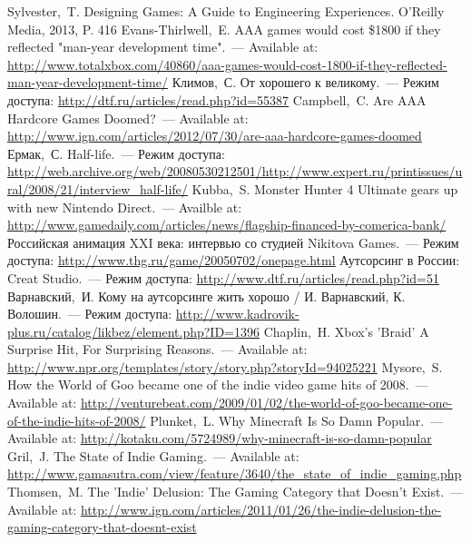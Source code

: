 \renewcommand{\bibname}{Список используемой литературы}
\begin{thebibliography}{10}
     Sylvester,~T. Designing Games: A Guide to Engineering Experiences. O'Reilly Media, 2013, 
        P. 416
     Evans-Thirlwell,~E. AAA games would cost \$1800 if they reflected "man-year development 
        time".~--- Available at: 
        \url{http://www.totalxbox.com/40860/aaa-games-would-cost-1800-if-they-reflected-man-year-development-time/}
     Климов,~С. От хорошего к великому.~--- Режим доступа: 
        \url{http://dtf.ru/articles/read.php?id=55387}
     Campbell,~C. Are AAA Hardcore Games Doomed?~--- Available at: 
        \url{http://www.ign.com/articles/2012/07/30/are-aaa-hardcore-games-doomed}
     Ермак,~С. Half-life.~--- Режим доступа: 
        \url{http://web.archive.org/web/20080530212501/http://www.expert.ru/printissues/ural/2008/21/interview_half-life/}
     Kubba,~S. Monster Hunter 4 Ultimate gears up with new Nintendo Direct.~--- Availble at: 
        \url{http://www.gamedaily.com/articles/news/flagship-financed-by-comerica-bank/}
     Российская анимация XXI века: интервью со студией Nikitova Games.~--- Режим доступа: 
        \url{http://www.thg.ru/game/20050702/onepage.html}
     Аутсорсинг в России: Creat Studio.~--- Режим доступа: 
        \url{http://www.dtf.ru/articles/read.php?id=51}
     Варнавский,~И. Кому на аутсорсинге жить хорошо / И. Варнавский, К. Волошин.~--- 
        Режим доступа: \url{http://www.kadrovik-plus.ru/catalog/likbez/element.php?ID=1396}
     Chaplin,~H. Xbox's 'Braid' A Surprise Hit, For Surprising Reasons.~--- Available at: 
        \url{http://www.npr.org/templates/story/story.php?storyId=94025221}
     Mysore,~S. How the World of Goo became one of the indie video game hits of 2008.~--- 
        Available at:
        \url{http://venturebeat.com/2009/01/02/the-world-of-goo-became-one-of-the-indie-hits-of-2008/}
     Plunket,~L. Why Minecraft Is So Damn Popular.~--- Available at: 
        \url{http://kotaku.com/5724989/why-minecraft-is-so-damn-popular}
     Gril,~J. The State of Indie Gaming.~--- Available at: 
        \url{http://www.gamasutra.com/view/feature/3640/the_state_of_indie_gaming.php}
     Thomsen,~M. The 'Indie' Delusion: The Gaming Category that Doesn't Exist.~--- Available at:
        \url{http://www.ign.com/articles/2011/01/26/the-indie-delusion-the-gaming-category-that-doesnt-exist}

\end{thebibliography}
